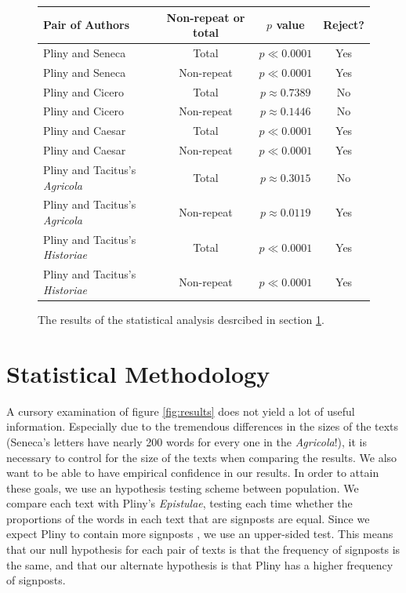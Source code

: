 \begin{figure}[t]
  \begin{center}
    \begin{tabular}{| l | c | c | c |}
      \hline
      Pair of Authors & Non-repeat or total & $p$ value & Reject? \\ \hline \hline
      Pliny and Seneca & Total & $p \ll 0.0001$ & Yes \\ \hline
      Pliny and Seneca & Non-repeat & $p \ll 0.0001$ & Yes \\ \hline
      Pliny and Cicero & Total & $p \approx 0.7389$ & No \\ \hline
      Pliny and Cicero & Non-repeat & $p \approx 0.1446$ & No \\ \hline
      Pliny and Caesar & Total & $p \ll 0.0001$ & Yes \\ \hline
      Pliny and Caesar & Non-repeat & $p \ll 0.0001$ & Yes \\ \hline
      Pliny and Tacitus's \textit{Agricola} & Total & $p \approx 0.3015$ & No \\ \hline
      Pliny and Tacitus's \textit{Agricola} & Non-repeat & $p \approx 0.0119$ & Yes \\ \hline
      Pliny and Tacitus's \textit{Historiae} & Total & $p \ll 0.0001$ & Yes \\ \hline
      Pliny and Tacitus's \textit{Historiae} & Non-repeat & $p \ll 0.0001$ & Yes \\      
      \hline
    \end{tabular}
  \end{center}
  \caption{\label{fig:stats}The results of the statistical analysis desrcibed in section \ref{sec:stats}.}
\end{figure}

\section{Statistical Methodology}
\label{sec:stats}

A cursory examination of figure \ref{fig:results} does not yield a lot of useful information. Especially due to the tremendous differences in the sizes of the texts (Seneca's letters have nearly 200 words for every one in the \textit{Agricola}!), it is necessary to control for the size of the texts when comparing the results. We also want to be able to have empirical confidence in our results. In order to attain these goals, we use an hypothesis testing scheme between population. We compare each text with Pliny's \textit{Epistulae}, testing each time whether the proportions of the words in each text that are signposts are equal. Since we expect Pliny to contain more signposts \cite{Woodmanpm}, we use an upper-sided test. This means that our null hypothesis for each pair of texts is that the frequency of signposts is the same, and that our alternate hypothesis is that Pliny has a higher frequency of signposts.

